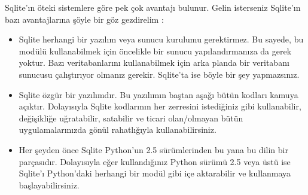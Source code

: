 Sqlite’ın öteki sistemlere göre pek çok avantajı bulunur. Gelin isterseniz Sqlite’ın bazı avantajlarına şöyle bir göz gezdirelim :\\
\begin{itemize}
\item Sqlite herhangi bir yazılım veya sunucu kurulumu gerektirmez. Bu sayede, bu modülü kullanabilmek için öncelikle bir sunucu yapılandırmanıza da gerek yoktur. Bazı veritabanlarını kullanabilmek için arka planda bir veritabanı sunucusu çalıştırıyor olmanız gerekir. Sqlite’ta ise böyle bir şey yapmazsınız.
\item Sqlite özgür bir yazılımdır. Bu yazılımın baştan aşağı bütün kodları kamuya açıktır. Dolayısıyla Sqlite kodlarının her zerresini istediğiniz gibi kullanabilir, değişikliğe uğratabilir, satabilir ve ticari olan/olmayan bütün uygulamalarınızda gönül rahatlığıyla kullanabilirsiniz.
\item Her şeyden önce Sqlite Python’un 2.5 sürümlerinden bu yana bu dilin bir parçasıdır. Dolayısıyla eğer kullandığınız Python sürümü 2.5 veya üstü ise Sqlite’ı Python’daki herhangi bir modül gibi içe aktarabilir ve kullanmaya başlayabilirsiniz.
\end{itemize}
